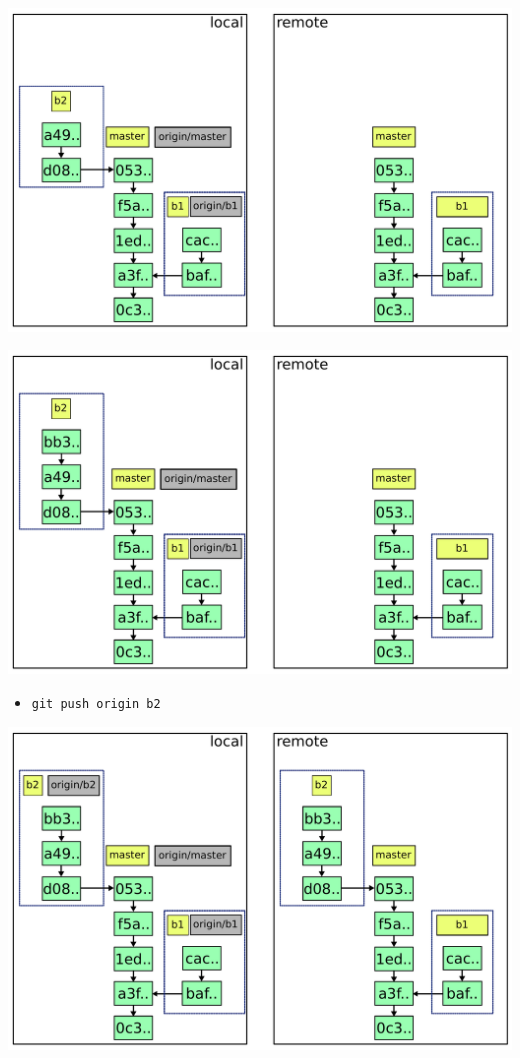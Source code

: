 \documentclass{beamer}
\begin{document}
\begin{frame}{}
  \includegraphics[width=\textwidth]{img/3-ter.pdf}
\end{frame}

\begin{frame}{}
  \includegraphics[width=\textwidth]{img/3-quad.pdf}
\end{frame}

\begin{frame}{}
  \begin{itemize}
  \item \lstinline|git push origin b2|
  \end{itemize}
\end{frame}

\begin{frame}{}
  \includegraphics[width=\textwidth]{img/4.pdf}
\end{frame}
\end{document}
